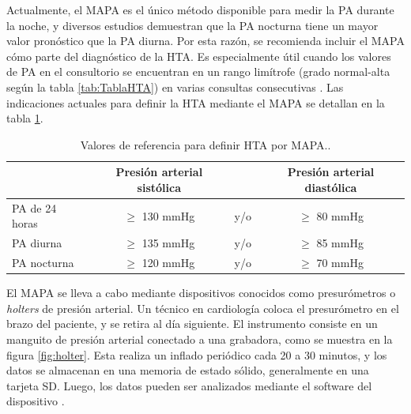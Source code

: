 Actualmente, el MAPA es el único método disponible para medir la PA durante la noche, y diversos estudios 
demuestran que la PA nocturna tiene un mayor valor pronóstico que la PA diurna. Por esta razón, se recomienda 
incluir el MAPA cómo parte del diagnóstico de la HTA. Es especialmente útil cuando los valores de PA en el 
consultorio se encuentran en un rango limítrofe (grado normal-alta según la tabla \ref{tab:TablaHTA}) en 
varias consultas consecutivas \citep{CITE:7}. Las indicaciones actuales para definir la HTA mediante el MAPA se detallan 
en la tabla \ref{tab:HTA-MAPA}.

\begin{table}[h]
	\centering
	\caption[Valores de referencia para definir HTA por MAPA]{Valores de referencia para definir HTA por MAPA.\protect\footnotemark.}
	\begin{tabular}{l c c c}    
		\toprule
		\textbf{} 	      & \textbf{Presión arterial sistólica} 	& \textbf{}	& \textbf{Presión arterial diastólica}  \\
		\midrule
    PA de 24 horas     &  $\geq$ 130 mmHg                     & 	y/o			&  $\geq$ 80 mmHg \\	
    PA diurna          &  $\geq$ 135 mmHg                     & 	y/o			&  $\geq$ 85 mmHg \\	
    PA nocturna        &  $\geq$ 120 mmHg                     & 	y/o			&  $\geq$ 70 mmHg \\	
		\bottomrule
		\hline
	\end{tabular}
	\label{tab:HTA-MAPA}
\end{table}


El MAPA se lleva a cabo mediante dispositivos conocidos como presurómetros o \textit{holters} de presión arterial. 
Un técnico en cardiología coloca el presurómetro en el brazo del paciente, y se retira al día siguiente. 
El instrumento consiste en un manguito de presión arterial conectado a una grabadora, como se muestra en 
la figura \ref{fig:holter}. Esta realiza un inflado periódico cada 20 a 30 minutos, y los datos se almacenan en una memoria 
de estado sólido, generalmente en una tarjeta SD. Luego, los datos pueden ser analizados mediante el software del 
dispositivo \citep{CITE:3} \citep{CITE:7}.


